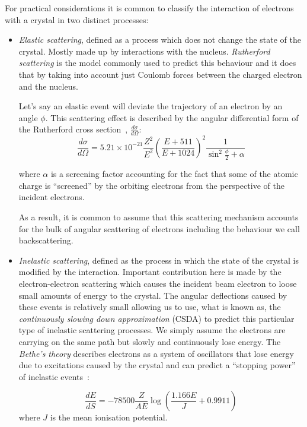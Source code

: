 For practical considerations it is common to classify the interaction of electrons with a crystal in two distinct processes:
\begin{itemize}
\item \textit{Elastic scattering}, defined as a process which does not change the state of the crystal. Mostly made up by interactions with the nucleus. \textit{Rutherford scattering} is the model commonly used to predict this behaviour and it does that by taking into account just Coulomb forces between the charged electron and the nucleus. 

Let's say an elastic event will deviate the trajectory of an electron by an angle $\phi$. This scattering effect is described by the angular differential form of the Rutherford cross section~\cite{Reimer76}, $\frac{d \sigma}{d \Omega}$:
\begin{equation*}
\frac{d \sigma}{d \Omega} = 5.21 \times 10^{-21} \frac{Z^2}{E^2} \left(\frac{E+511}{E+1024}\right)^2 \frac{1}{\sin^2{\frac{\phi}{2}} + \alpha}
\end{equation*}

where $\alpha$ is a screening factor accounting for the fact that some of the atomic charge is ``screened'' by the orbiting electrons from the perspective of the incident electrons.

As a result, it is common to assume that this scattering mechanism accounts for  the bulk of angular scattering of electrons including the behaviour we call backscattering.


\item \textit{Inelastic scattering}, defined as the process in which the state of the crystal is modified by the interaction. Important contribution here is made by the electron-electron scattering which causes the incident beam electron to loose small amounts of energy to the crystal. The angular deflections caused by these events is relatively small allowing us to use, what is known as, the \textit{continuously slowing down approximation} (CSDA) to  predict this particular type of inelastic scattering processes. We simply assume the electrons are carrying on the same path but slowly and continuously lose energy. The \textit{Bethe's theory} describes electrons as a system of oscillators that lose energy due to excitations caused by the crystal and can predict a ``stopping power'' of inelastic events~\cite{joy1989}:

\begin{equation*}
    \frac{dE}{dS} = -78500 \frac{Z}{A E} \log{\left( \frac{1.166E}{J} + 0.9911\right)}
\end{equation*}
where $J$ is the mean ionisation potential. 
\end{itemize}


